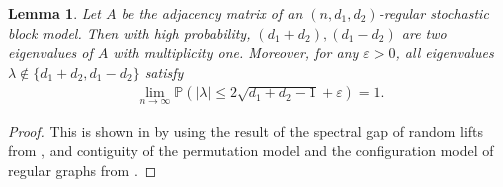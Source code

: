 \documentclass[11pt,reqno]{amsart}
\newtheorem{lemma}[theorem]{Lemma}
\theoremstyle{definition}
\begin{document}
\begin{lemma}\label{lem:spectral_gap}
Let $A$ be the adjacency matrix of an $(n,d_1,d_2)$-regular stochastic block model. Then with high probability, $(d_1+d_2), (d_1-d_2)$ are two eigenvalues of $A$ with multiplicity one. Moreover, for any $\varepsilon>0$,  all eigenvalues $\lambda\notin \{d_1+d_2,d_1-d_2\}$ satisfy 
\begin{align}\label{eq:spectral_bound}
   \lim_{n\to\infty} \mathbb P \left( |\lambda|\leq 2\sqrt{d_1+d_2-1}+\varepsilon\right)= 1.
\end{align}

\end{lemma}
\begin{proof}
  This is shown in  \cite[Section 4]{brito2015recovery} by using the result of the spectral gap of random lifts from \cite[Corollary 24]{bordenave2020new}, and contiguity of the permutation model and the configuration model of regular graphs from \cite[Theorem 1.3]{greenhill2002permutation}.
\end{proof}
\end{document}
